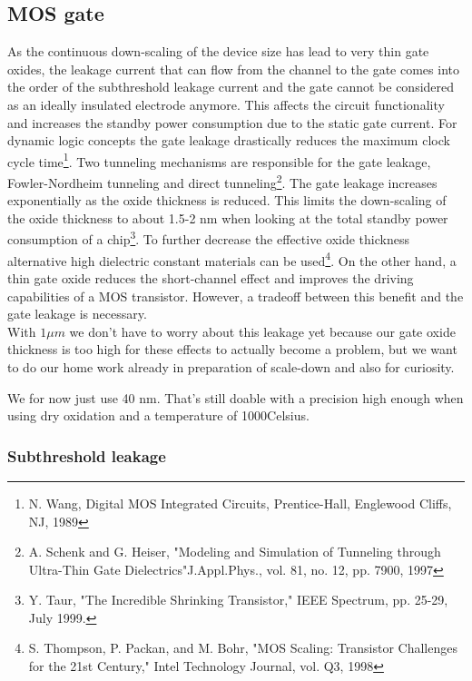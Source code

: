 \subsection{MOS gate}\label{gate_dimensioning}
As the continuous down-scaling of the device size has lead to very thin gate oxides, the leakage current that can flow from the channel to the gate comes into the order of the subthreshold leakage current and the gate cannot be considered as an ideally insulated electrode anymore.
This affects the circuit functionality and increases the standby power consumption due to the static gate current.
For dynamic logic concepts the gate leakage drastically reduces the maximum clock cycle time\footnote{N. Wang, Digital MOS Integrated Circuits, Prentice-Hall, Englewood Cliffs, NJ, 1989}.
Two tunneling mechanisms are responsible for the gate leakage, Fowler-Nordheim tunneling and direct tunneling\footnote{A. Schenk and G. Heiser, "Modeling and Simulation of Tunneling through Ultra-Thin Gate Dielectrics"J.Appl.Phys., vol. 81, no. 12, pp. 7900, 1997}.
The gate leakage increases exponentially as the oxide thickness is reduced.
This limits the down-scaling of the oxide thickness to about 1.5-2 nm when looking at the total standby power consumption of a chip\footnote{Y. Taur, "The Incredible Shrinking Transistor," IEEE Spectrum, pp. 25-29, July 1999.}.
To further decrease the effective oxide thickness alternative high dielectric constant materials can be used\footnote{S. Thompson, P. Packan, and M. Bohr, "MOS Scaling: Transistor Challenges for the 21st Century," Intel Technology Journal, vol. Q3, 1998}.
On the other hand, a thin gate oxide reduces the short-channel effect and improves the driving capabilities of a MOS transistor.
However, a tradeoff between this benefit and the gate leakage is necessary.\\

With $1 \mu m$ we don't have to worry about this leakage yet because our gate oxide thickness is too high for these effects to actually become a problem, but we want to do our home work already in preparation of scale-down and also for curiosity.

We for now just use 40 nm. That's still doable with a precision high enough when using dry oxidation and a temperature of 1000\degree Celsius.

\subsubsection{Subthreshold leakage}

